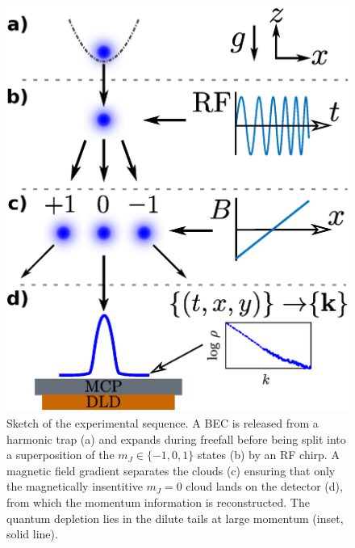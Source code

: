 	


	\begin{figure}
	    \begin{minipage}{0.45\textwidth}
	    \vspace{0cm}
	    \caption{Sketch of the experimental sequence. A BEC is released from a harmonic trap %
	    (a) and expands during freefall before being split into a superposition of the $m_J\in\{-1,0,1\}$ states (b) by an RF chirp. A magnetic field gradient separates the clouds (c) ensuring that only the magnetically insentitive $m_J=0$ cloud lands on the detector (d), from which the momentum information is reconstructed. The quantum depletion lies in the dilute tails at large momentum (inset, solid line).}
	    \label{fig:sequence}
	    \end{minipage}
	    \hfill
		\begin{minipage}{0.55\textwidth}
		\vspace{0cm}
	    \includegraphics[width=\textwidth]{fig/depletion/exp_cartoon.eps}
	    \end{minipage}
	\end{figure}

